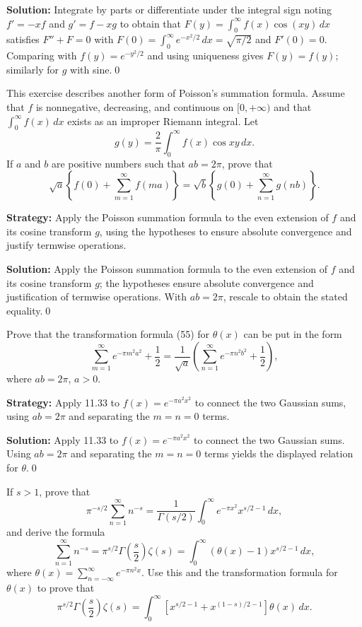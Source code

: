 \bigskip\noindent\textbf{Solution:}
Integrate by parts or differentiate under the integral sign noting $f'= -x f$ and $g'= f- x g$ to obtain that $F(y)=\int_0^{\infty} f(x)\cos(xy)\,dx$ satisfies $F''+F=0$ with $F(0)=\int_0^{\infty} e^{-x^2/2}\,dx=\sqrt{\pi/2}$ and $F'(0)=0$. Comparing with $f(y)=e^{-y^2/2}$ and using uniqueness gives $F(y)=f(y)$; similarly for $g$ with sine.\qed


\begin{problembox}
This exercise describes another form of Poisson's summation formula. Assume that $f$ is nonnegative, decreasing, and continuous on $[0, +\infty)$ and that $\int_0^\infty f(x) \, dx$ exists as an improper Riemann integral. Let
\[
g(y) = \frac{2}{\pi} \int_0^\infty f(x) \cos xy \, dx.
\]
If $a$ and $b$ are positive numbers such that $ab = 2\pi$, prove that
\[
\sqrt{a} \left\{ f(0) + \sum_{m=1}^\infty f(ma) \right\} = \sqrt{b} \left\{ g(0) + \sum_{n=1}^\infty g(nb) \right\}.
\]
\end{problembox}

\noindent\textbf{Strategy:} Apply the Poisson summation formula to the even extension of $f$ and its cosine transform $g$, using the hypotheses to ensure absolute convergence and justify termwise operations.

\bigskip\noindent\textbf{Solution:}
Apply the Poisson summation formula to the even extension of $f$ and its cosine transform $g$; the hypotheses ensure absolute convergence and justification of termwise operations. With $ab=2\pi$, rescale to obtain the stated equality.\qed


\begin{problembox}
Prove that the transformation formula (55) for $\theta(x)$ can be put in the form
\[
\sum_{m=1}^\infty e^{-\pi m^2 a^2} + \frac{1}{2} = \frac{1}{\sqrt{a}} \left( \sum_{n=1}^\infty e^{-\pi n^2 b^2} + \frac{1}{2} \right),
\]
where $ab = 2\pi$, $a > 0$.
\end{problembox}

\noindent\textbf{Strategy:} Apply 11.33 to $f(x)=e^{-\pi a^2 x^2}$ to connect the two Gaussian sums, using $ab=2\pi$ and separating the $m=n=0$ terms.

\bigskip\noindent\textbf{Solution:}
Apply 11.33 to $f(x)=e^{-\pi a^2 x^2}$ to connect the two Gaussian sums. Using $ab=2\pi$ and separating the $m=n=0$ terms yields the displayed relation for $\theta$.\qed


\begin{problembox}
If $s > 1$, prove that
\[
\pi^{-s/2} \sum_{n=1}^\infty n^{-s} = \frac{1}{\Gamma(s/2)} \int_0^\infty e^{-\pi x^2} x^{s/2-1} \, dx,
\]
and derive the formula
\[
\sum_{n=1}^\infty n^{-s} = \pi^{s/2} \Gamma\left(\frac{s}{2}\right) \zeta(s) = \int_0^\infty \left( \theta(x) - 1 \right) x^{s/2-1} \, dx,
\]
where $\theta(x) = \sum_{n=-\infty}^\infty e^{-\pi n^2 x}$. Use this and the transformation formula for $\theta(x)$ to prove that
\[
\pi^{s/2} \Gamma\left(\frac{s}{2}\right) \zeta(s) = \int_0^\infty \left[ x^{s/2-1} + x^{(1-s)/2-1} \right] \theta(x) \, dx.
\]
\end{problembox}

